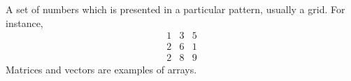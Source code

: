 A set of numbers which is presented in a particular pattern,
usually a grid. For instance, 
$$
\begin{array}{ccc}
  1 & 3 & 5 \\ 
  2 & 6 & 1 \\ 
  2 & 8 & 9 
\end{array}
$$
Matrices and vectors are examples of arrays.